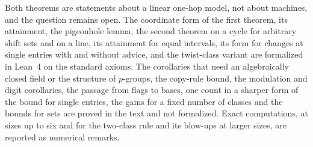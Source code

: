 Both theorems are statements about a linear one-hop model, not about machines, and the question remains open. The
coordinate form of the first theorem, its attainment, the pigeonhole lemma, the second theorem on a cycle for arbitrary
shift sets and on a line, its attainment for equal intervals, its form for changes at single entries with and
without advice, and the twist-class variant are formalized in Lean~4 on the standard axioms. The corollaries that need an algebraically closed
field or the structure of $p$-groups, the copy-rule bound, the modulation and digit corollaries, the passage from
flags to bases, one count in a sharper form of the bound for single entries, the gains for a fixed number of
classes and the bounds for sets are proved in the text and not formalized. Exact computations, at sizes up to six and for the two-class rule and its blow-ups at larger sizes, are
reported as numerical remarks.
